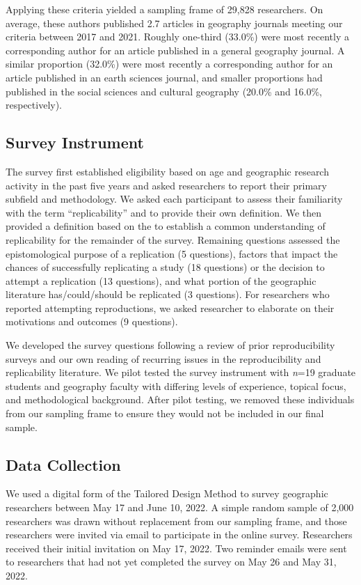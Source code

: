 \documentclass[]{interact}
\theoremstyle{plain}%
\theoremstyle{definition}
\theoremstyle{remark}
\begin{document}
Applying these criteria yielded a sampling frame of 29,828 researchers. 
On average, these authors published 2.7 articles in geography journals meeting our criteria between 2017 and 2021. 
Roughly one-third (33.0\%) were most recently a corresponding author for an article published in a general geography journal. 
A similar proportion (32.0\%) were most recently a corresponding author for an article published in an earth sciences journal, and smaller proportions had published in the social sciences and cultural geography (20.0\% and 16.0\%, respectively).

\subsection*{Survey Instrument}
The survey first established eligibility based on age and geographic research activity in the past five years and asked researchers to report their primary subfield and methodology.
We asked each participant to assess their familiarity with the term ``replicability'' and to provide their own definition. 
We then provided a definition based on the \citet{nosek2020replication}  to establish a common understanding of replicability for the remainder of the survey.
Remaining questions assessed the epistomological purpose of a replication (5 questions), factors that impact the chances of successfully replicating a study (18 questions) or the decision to attempt a replication (13 questions), and what portion of the geographic literature has/could/should be replicated (3 questions).
For researchers who reported attempting reproductions, we asked researcher to elaborate on their motivations and outcomes (9 questions).

We developed the survey questions following a review of prior reproducibility surveys \citep[e.g.,][]{fanelli2009many,baker20161, konkol2019} and our own reading of recurring issues in the reproducibility and replicability literature. 
We pilot tested the survey instrument with \textit{n}=19 graduate students and geography faculty with differing levels of experience, topical focus, and methodological background. 
After pilot testing, we removed these individuals from our sampling frame to ensure they would not be included in our final sample.

\subsection*{Data Collection}
We used a digital form of the Tailored Design Method \citep{dillman2014internet} to survey geographic researchers between May 17 and June 10, 2022.
A simple random sample of 2,000 researchers was drawn without replacement from our sampling frame, and those researchers were invited via email to participate in the online survey. 
Researchers received their initial invitation on May 17, 2022. 
Two reminder emails were sent to researchers that had not yet completed the survey on May 26 and May 31, 2022.
\end{document}
